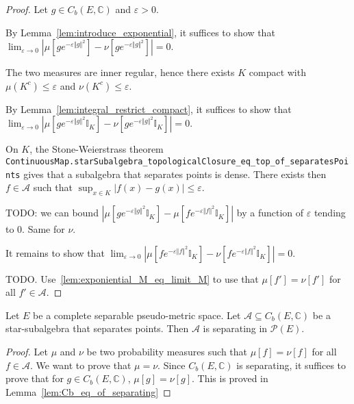 \begin{proof}
Let $g \in C_b(E, \mathbb{C})$ and $\varepsilon > 0$.

By Lemma~\ref{lem:introduce_exponential}, it suffices to show that $\lim_{\varepsilon \to 0} \left\vert \mu\left[g e^{-\varepsilon \Vert g \Vert^2} \right] - \nu\left[g e^{-\varepsilon \Vert g \Vert^2} \right] \right\vert = 0$.

The two measures are inner regular, hence there exists $K$ compact with $\mu(K^c) \le \varepsilon$ and $\nu(K^c) \le \varepsilon$.

By Lemma~\ref{lem:integral_restrict_compact}, it suffices to show that $\lim_{\varepsilon \to 0} \left\vert \mu\left[g e^{-\varepsilon \Vert g \Vert^2} \mathbb{I}_K \right] - \nu\left[g e^{-\varepsilon \Vert g \Vert^2} \mathbb{I}_K \right] \right\vert = 0$.

On $K$, the Stone-Weierstrass theorem \texttt{ContinuousMap.starSubalgebra\_topologicalClosure\_eq\_top\_of\_separatesPoints} gives that a subalgebra that separates points is dense. There exists then $f \in \mathcal A$ such that $\sup_{x \in K} \left\vert f(x) - g(x) \right\vert \le \varepsilon$.

TODO: we can bound $\left\vert \mu\left[g e^{-\varepsilon \Vert g \Vert^2} \mathbb{I}_K \right] - \mu\left[f e^{-\varepsilon \Vert f \Vert^2} \mathbb{I}_K \right] \right\vert$ by a function of $\varepsilon$ tending to 0. Same for $\nu$.

It remains to show that $\lim_{\varepsilon \to 0} \left\vert \mu\left[f e^{-\varepsilon \Vert f \Vert^2} \mathbb{I}_K \right] - \nu\left[f e^{-\varepsilon \Vert f \Vert^2} \mathbb{I}_K \right] \right\vert = 0$.

TODO. Use~\ref{lem:exponiential_M_eq_limit_M} to use that $\mu[f'] = \nu[f']$ for all $f' \in \mathcal A$.
\end{proof}

\begin{theorem}\label{thm:separating_starSubalgebra}
Let $E$ be a complete separable pseudo-metric space. Let $\mathcal A \subseteq C_b(E, \mathbb{C})$ be a star-subalgebra that separates points. Then $\mathcal A$ is separating in $\mathcal P(E)$.
\end{theorem}

\begin{proof}
Let $\mu$ and $\nu$ be two probability measures such that $\mu[f] = \nu[f]$ for all $f \in \mathcal A$. We want to prove that $\mu = \nu$. Since $C_b(E, \mathbb{C})$ is separating, it suffices to prove that for $g \in C_b(E, \mathbb{C})$, $\mu[g] = \nu[g]$. This is proved in Lemma~\ref{lem:Cb_eq_of_separating}
\end{proof}

